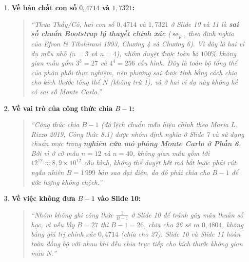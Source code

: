\documentclass[10pt,a4paper]{article}
\begin{document}
\begin{enumerate}
    \item \textbf{Về bản chất con số $0{,}4714$ và $1{,}7321$:}
    \begin{quote}
    \itshape
    ``Thưa Thầy/Cô, hai con số $0{,}4714$ và $1{,}7321$ ở Slide 10 và 11 là \textbf{sai số chuẩn Bootstrap lý thuyết chính xác} ($\operatorname{se}_{\hat F}$, theo định nghĩa của Efron \& Tibshirani 1993, Chương 4 và Chương 6). Vì đây là hai ví dụ mẫu nhỏ ($n=3$ và $n=4$), nhóm duyệt được toàn bộ $100\%$ không gian mẫu gồm $3^3 = 27$ và $4^4 = 256$ cấu hình. Đây là toàn bộ tổng thể của phân phối thực nghiệm, nên phương sai được tính bằng cách chia cho kích thước tổng thể $N$ (không trừ 1), và ở hai ví dụ này không hề có sai số Monte Carlo.''
    \end{quote}

    \item \textbf{Về vai trò của công thức chia $B-1$:}
    \begin{quote}
    \itshape
    ``Công thức chia $B-1$ (độ lệch chuẩn mẫu hiệu chỉnh theo Maria L. Rizzo 2019, Công thức 8.1) được nhóm định nghĩa ở Slide 7 và sử dụng chuẩn mực trong \textbf{nghiên cứu mô phỏng Monte Carlo ở Phần 6}. Bởi vì ở cỡ mẫu $n=12$ và $n=40$, không gian mẫu gồm tới $12^{12} \approx 8{,}9 \times 10^{12}$ cấu hình, không thể duyệt hết mà bắt buộc phải rút ngẫu nhiên $B = 1\,999$ bản sao đại diện, do đó phải chia cho $B-1$ để ước lượng không chệch.''
    \end{quote}

    \item \textbf{Về việc không đưa $B-1$ vào Slide 10:}
    \begin{quote}
    \itshape
    ``Nhóm không ghi công thức $\frac{1}{B-1}$ ở Slide 10 để tránh gây mâu thuẫn số học, vì nếu lấy $B=27$ thì $B-1 = 26$, chia cho 26 sẽ ra $0{,}4804$, không bằng giá trị chính xác $0{,}4714$ (chia cho 27). Slide 10 và Slide 11 hoàn toàn đồng bộ với nhau khi đều chia trực tiếp cho kích thước không gian mẫu $N$.''
    \end{quote}
\end{enumerate}
\end{document}
